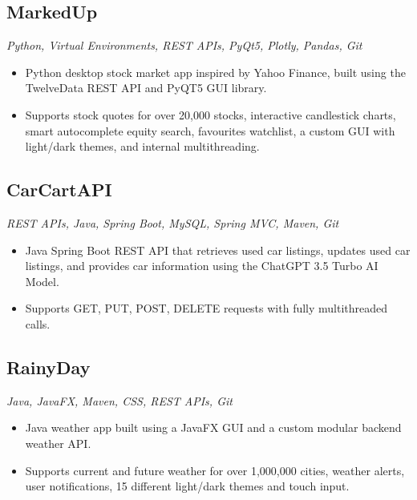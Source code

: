 \documentclass[10pt, a4paper]{article}
\begin{document}
\subsection*{MarkedUp}
\textit{Python, Virtual Environments, REST APIs, PyQt5, Plotly, Pandas, Git}
\begin{itemize}
    \item Python desktop stock market app inspired by Yahoo Finance, built using the TwelveData REST API and PyQT5 GUI library.
    \item Supports stock quotes for over 20,000 stocks, interactive candlestick charts, smart autocomplete equity search, favourites watchlist, a custom GUI with light/dark themes, and internal multithreading.
\end{itemize}

\subsection*{CarCartAPI}
\textit{REST APIs, Java, Spring Boot, MySQL, Spring MVC, Maven, Git}
\begin{itemize}
    \item Java Spring Boot REST API that retrieves used car listings, updates used car listings, and provides car information using the ChatGPT 3.5 Turbo AI Model.
    \item Supports GET, PUT, POST, DELETE requests with fully multithreaded calls.
\end{itemize}

\subsection*{RainyDay}
\textit{Java, JavaFX, Maven, CSS, REST APIs, Git}
\begin{itemize}
    \item Java weather app built using a JavaFX GUI and a custom modular backend weather API.
    \item Supports current and future weather for over 1,000,000 cities, weather alerts, user notifications, 15 different light/dark themes and touch input.
\end{itemize}

\end{document}
